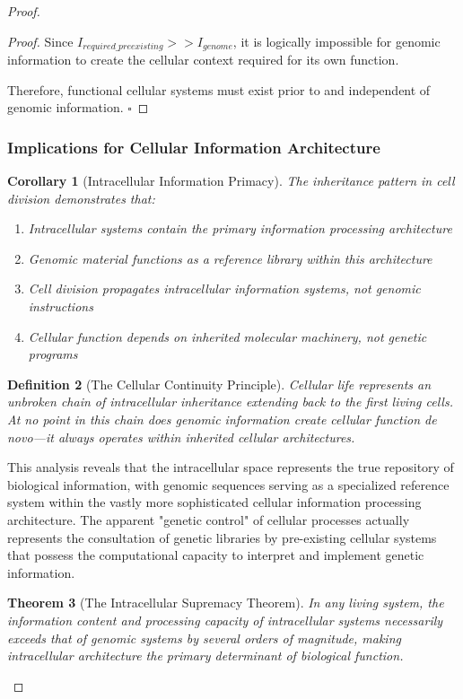 \documentclass[12pt,a4paper]{article}
\newtheorem{theorem}{Theorem}[section]
\newtheorem{definition}[theorem]{Definition}
\newtheorem{corollary}[theorem]{Corollary}
\begin{document}
\begin{proof}
\begin{proof}
Since $I_{required\_preexisting} >> I_{genome}$, it is logically impossible for genomic information to create the cellular context required for its own function.

Therefore, functional cellular systems must exist prior to and independent of genomic information. $\square$
\end{proof}

\subsubsection{Implications for Cellular Information Architecture}

\begin{corollary}[Intracellular Information Primacy]
The inheritance pattern in cell division demonstrates that:
\begin{enumerate}
\item Intracellular systems contain the primary information processing architecture
\item Genomic material functions as a reference library within this architecture
\item Cell division propagates intracellular information systems, not genomic instructions
\item Cellular function depends on inherited molecular machinery, not genetic programs
\end{enumerate}
\end{corollary}

\begin{definition}[The Cellular Continuity Principle]
Cellular life represents an unbroken chain of intracellular inheritance extending back to the first living cells. At no point in this chain does genomic information create cellular function de novo—it always operates within inherited cellular architectures.
\end{definition}

This analysis reveals that the intracellular space represents the true repository of biological information, with genomic sequences serving as a specialized reference system within the vastly more sophisticated cellular information processing architecture. The apparent "genetic control" of cellular processes actually represents the consultation of genetic libraries by pre-existing cellular systems that possess the computational capacity to interpret and implement genetic information.

\begin{theorem}[The Intracellular Supremacy Theorem]
In any living system, the information content and processing capacity of intracellular systems necessarily exceeds that of genomic systems by several orders of magnitude, making intracellular architecture the primary determinant of biological function.
\end{theorem}


\end{proof}
\end{document}
